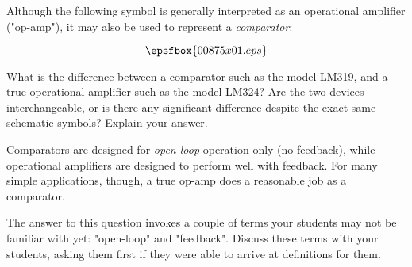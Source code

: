 

Although the following symbol is generally interpreted as an operational amplifier ("op-amp"), it may also be used to represent a {\it comparator}:

$$\epsfbox{00875x01.eps}$$

What is the difference between a comparator such as the model LM319, and a true operational amplifier such as the model LM324?  Are the two devices interchangeable, or is there any significant difference despite the exact same schematic symbols?  Explain your answer.







Comparators are designed for {\it open-loop} operation only (no feedback), while operational amplifiers are designed to perform well with feedback.  For many simple applications, though, a true op-amp does a reasonable job as a comparator.







The answer to this question invokes a couple of terms your students may not be familiar with yet: "open-loop" and "feedback".  Discuss these terms with your students, asking them first if they were able to arrive at definitions for them.




